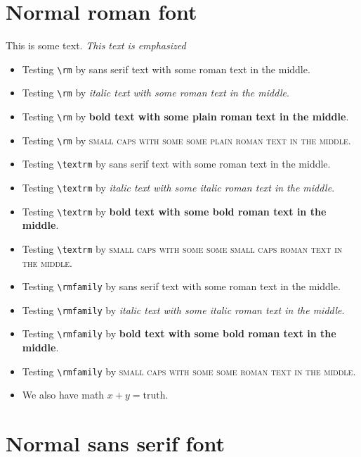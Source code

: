 \documentclass{article}
\begin{document}
\section{Normal roman font}

This is some text.  \emph{This text is emphasized}
\begin{itemize}
\item
Testing \verb#\rm# by \textsf{sans serif text with {\rm some roman text} in the middle}.
\item
Testing \verb#\rm# by \textit{italic text with {\rm some roman text} in the middle}.
\item
Testing \verb#\rm# by \textbf{bold text with {\rm some plain roman text} in the middle}.
\item
Testing \verb#\rm# by \textsc{small caps with some {\rm some plain roman text} in the middle}.
\item
Testing \verb#\textrm# by \textsf{sans serif text with \textrm{some roman text} in the middle}.
\item
Testing \verb#\textrm# by \textit{italic text with \textrm{some italic roman text} in the middle}.
\item
Testing \verb#\textrm# by \textbf{bold text with \textrm{some bold roman text} in the middle}.
\item
Testing \verb#\textrm# by \textsc{small caps with some \textrm{some small caps roman text} in the middle}.
\item
Testing \verb#\rmfamily# by \textsf{sans serif text with {\rmfamily some roman text} in the middle}.
\item
Testing \verb#\rmfamily# by \textit{italic text with {\rmfamily some italic roman text} in the middle}.
\item
Testing \verb#\rmfamily# by \textbf{bold text with {\rmfamily some bold roman text} in the middle}.
\item
Testing \verb#\rmfamily# by \textsc{small caps with some {\rmfamily some roman text} in the middle}.
\item
We also have math $x+y = \mathrm{truth}$.
\end{itemize}

\section{Normal sans serif font}
\end{document}
